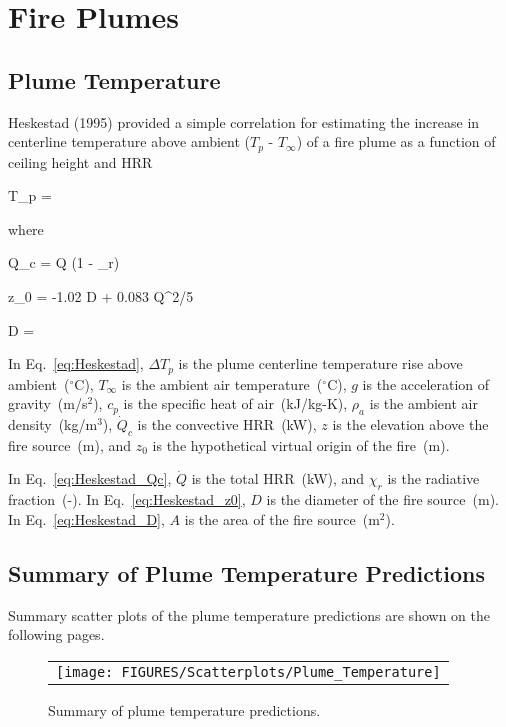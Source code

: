 \chapter{Fire Plumes}

\section{Plume Temperature}

Heskestad (1995) provided a simple correlation for estimating the increase in centerline temperature above ambient ($T_p$ - $T_\infty$) of a fire plume as a function of ceiling height and HRR

\be
\Delta T_p = 
\label{eq:Heskestad}
\ee

\noindent where

\be
\dot Q_c = \dot Q (1 - \chi_r)
\label{eq:Heskestad_Qc}
\ee

\be
z_0 = -1.02 D + 0.083 \dot Q^{2/5}
\label{eq:Heskestad_z0}
\ee

\be
D = 
\label{eq:Heskestad_D}
\ee

In Eq.~\ref{eq:Heskestad}, $\Delta T_p$ is the plume centerline temperature rise above ambient~($^\circ$C), $T_\infty$ is the ambient air temperature~($^\circ$C), $g$ is the acceleration of gravity~(m/s$^2$), $c_p$ is the specific heat of air~(kJ/kg-K), $\rho_{a}$ is the ambient air density~(kg/m$^3$), $\dot Q_c$ is the convective HRR~(kW), $z$ is the elevation above the fire source~(m), and $z_0$ is the hypothetical virtual origin of the fire~(m).

In Eq.~\ref{eq:Heskestad_Qc}, $\dot Q$ is the total HRR~(kW), and $\chi_r$ is the radiative fraction~(-). In Eq.~\ref{eq:Heskestad_z0}, $D$ is the diameter of the fire source~(m). In Eq.~\ref{eq:Heskestad_D}, $A$ is the area of the fire source~(m$^2$).

\clearpage

\section{Summary of Plume Temperature Predictions}

Summary scatter plots of the plume temperature predictions are shown on the following pages.

\begin{figure}[ht]
\begin{center}
\begin{tabular}{l}
\texttt{[image: FIGURES/Scatterplots/Plume\_Temperature]}
\end{tabular}
\end{center}
\caption[Summary of plume temperature predictions.]
{Summary of plume temperature predictions.}
\label{Plume_Summary}
\end{figure}

